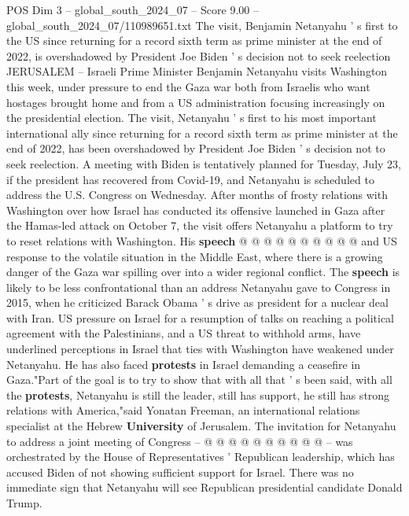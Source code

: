 \begin{textsample}{POS Dim 3 – global\_south\_2024\_07 – Score 9.00 – global\_south\_2024\_07/110989651.txt}  \label{ex:f3_pos_315}
The visit, Benjamin Netanyahu ' s first to the US since returning for a record sixth term as prime minister at the end of 2022, is overshadowed by President Joe Biden ' s decision not to seek reelection JERUSALEM -- Israeli Prime Minister Benjamin Netanyahu visits Washington this week, under pressure to end the Gaza war both from Israelis who want hostages brought home and from a US administration focusing increasingly on the presidential election.
The visit, Netanyahu ' s first to his most important international ally since returning for a record sixth term as prime minister at the end of 2022, has been overshadowed by President Joe Biden ' s decision not to seek reelection.
A meeting with Biden is tentatively planned for Tuesday, July 23, if the president has recovered from Covid-19, and Netanyahu is scheduled to address the U.S.
Congress on Wednesday.
After months of frosty relations with Washington over how Israel has conducted its offensive launched in Gaza after the Hamas-led attack on October 7, the visit offers Netanyahu a platform to try to reset relations with Washington.
His \textbf{speech} @ @ @ @ @ @ @ @ @ @ and US response to the volatile situation in the Middle East, where there is a growing danger of the Gaza war spilling over into a wider regional conflict.
The \textbf{speech} is likely to be less confrontational than an address Netanyahu gave to Congress in 2015, when he criticized Barack Obama ' s drive as president for a nuclear deal with Iran.
US pressure on Israel for a resumption of talks on reaching a political agreement with the Palestinians, and a US threat to withhold arms, have underlined perceptions in Israel that ties with Washington have weakened under Netanyahu.
He has also faced \textbf{protests} in Israel demanding a ceasefire in Gaza."Part of the goal is to try to show that with all that ' s been said, with all the \textbf{protests}, Netanyahu is still the leader, still has support, he still has strong relations with America,"said Yonatan Freeman, an international relations specialist at the Hebrew \textbf{University} of Jerusalem.
The invitation for Netanyahu to address a joint meeting of Congress -- @ @ @ @ @ @ @ @ @ @ -- was orchestrated by the House of Representatives ' Republican leadership, which has accused Biden of not showing sufficient support for Israel.
There was no immediate sign that Netanyahu will see Republican presidential candidate Donald Trump.

\end{textsample}
